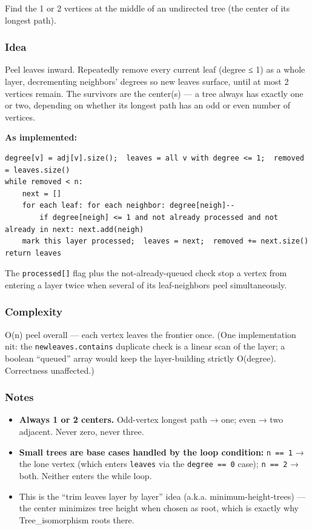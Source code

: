 \documentclass[
  10pt,
  letterpaper,
  onecolumn]{article}
\providecommand{\tightlist}{%
  \setlength{\itemsep}{0pt}\setlength{\parskip}{0pt}}
\begin{document}
Find the 1 or 2 vertices at the middle of an undirected tree (the center
of its longest path).

\hypertarget{idea-11}{%
\subsubsection{Idea}\label{idea-11}}

Peel leaves inward. Repeatedly remove every current leaf (degree ≤ 1) as
a whole layer, decrementing neighbors' degrees so new leaves surface,
until at most 2 vertices remain. The survivors are the center(s) --- a
tree always has exactly one or two, depending on whether its longest
path has an odd or even number of vertices.

\textbf{As implemented:}

\begin{verbatim}
degree[v] = adj[v].size();  leaves = all v with degree <= 1;  removed = leaves.size()
while removed < n:
    next = []
    for each leaf: for each neighbor: degree[neigh]--
        if degree[neigh] <= 1 and not already processed and not already in next: next.add(neigh)
    mark this layer processed;  leaves = next;  removed += next.size()
return leaves
\end{verbatim}

The \texttt{processed{[}{]}} flag plus the not-already-queued check stop
a vertex from entering a layer twice when several of its leaf-neighbors
peel simultaneously.

\hypertarget{complexity-11}{%
\subsubsection{Complexity}\label{complexity-11}}

O(n) peel overall --- each vertex leaves the frontier once. (One
implementation nit: the \texttt{newleaves.contains} duplicate check is a
linear scan of the layer; a boolean ``queued'' array would keep the
layer-building strictly O(degree). Correctness unaffected.)

\hypertarget{notes-10}{%
\subsubsection{Notes}\label{notes-10}}

\begin{itemize}
\tightlist
\item
  \textbf{Always 1 or 2 centers.} Odd-vertex longest path → one; even →
  two adjacent. Never zero, never three.
\item
  \textbf{Small trees are base cases handled by the loop condition:}
  \texttt{n\ ==\ 1} → the lone vertex (which enters \texttt{leaves} via
  the \texttt{degree\ ==\ 0} case); \texttt{n\ ==\ 2} → both. Neither
  enters the while loop.
\item
  This is the ``trim leaves layer by layer'' idea (a.k.a.
  minimum-height-trees) --- the center minimizes tree height when chosen
  as root, which is exactly why Tree\_isomorphism roots there.
\end{itemize}
\end{document}
